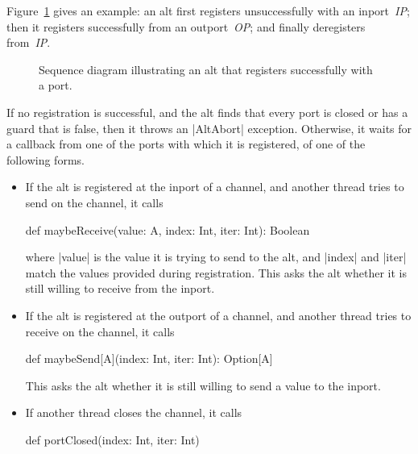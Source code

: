 \def\IP{\emph{IP}}
\def\OP{\emph{OP}}

Figure~\ref{fig:alt-1}
gives an example: an alt first registers unsuccessfully with an inport~\IP;
then it registers successfully from an outport~\OP; and finally deregisters
from~\IP. 


\begin{figure}
\begin{center}
\def\height{5.5} %
\def\gap{3.5} %
\end{center}
\caption{Sequence diagram illustrating an alt that registers successfully with
  a port. \label{fig:alt-1}}
\end{figure}


If no registration is successful, and the alt finds that every port is closed
or has a guard that is false, then it throws an |AltAbort| exception.
Otherwise, it waits for a callback from one of the ports with which it is
registered, of one of the following forms.
%
\begin{itemize}
\item If the alt is registered at the inport of a channel, and another thread
  tries to send on the channel, it calls
\begin{scala}
def maybeReceive(value: A, index: Int, iter: Int): Boolean
\end{scala}
%
where |value| is the value it is trying to send to the alt, and |index| and
|iter| match the values provided during registration.  This asks the alt
whether it is still willing to receive from the inport.

\item If the alt is registered at the outport of a channel, and another thread
  tries to receive on the channel, it calls
%
\begin{scala}
def maybeSend[A](index: Int, iter: Int): Option[A]
\end{scala}
%
This asks the alt whether it is still willing to send a value to the inport.

\item If another thread closes the channel, it calls 
%
\begin{scala}
def portClosed(index: Int, iter: Int)
\end{scala}
\end{itemize}

